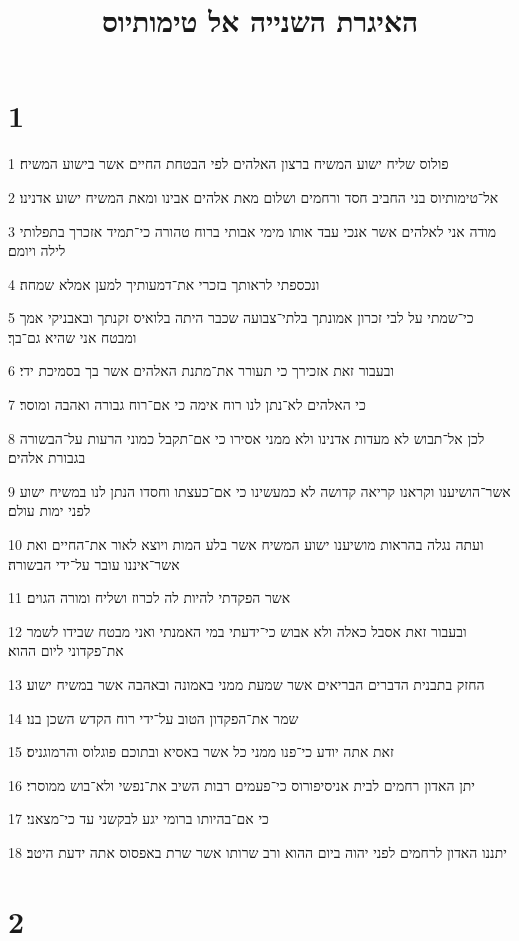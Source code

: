 

\title{האיגרת השנייה אל טימותיוס}


\chapter{1}

\par 1 פולוס שליח ישוע המשיח ברצון האלהים לפי הבטחת החיים אשר בישוע המשיח׃
\par 2 אל־טימותיוס בני החביב חסד ורחמים ושלום מאת אלהים אבינו ומאת המשיח ישוע אדנינו׃
\par 3 מודה אני לאלהים אשר אנכי עבד אותו מימי אבותי ברוח טהורה כי־תמיד אזכרך בתפלותי לילה ויומם׃
\par 4 ונכספתי לראותך בזכרי את־דמעותיך למען אמלא שמחה׃
\par 5 כי־שמתי על לבי זכרון אמונתך בלתי־צבועה שכבר היתה בלואיס זקנתך ובאבניקי אמך ומבטח אני שהיא גם־בך׃
\par 6 ובעבור זאת אזכירך כי תעורר את־מתנת האלהים אשר בך בסמיכת ידי׃
\par 7 כי האלהים לא־נתן לנו רוח אימה כי אם־רוח גבורה ואהבה ומוסר׃
\par 8 לכן אל־תבוש לא מעדות אדנינו ולא ממני אסירו כי אם־תקבל כמוני הרעות על־הבשורה בגבורת אלהים׃
\par 9 אשר־הושיענו וקראנו קריאה קדושה לא כמעשינו כי אם־כעצתו וחסדו הנתן לנו במשיח ישוע לפני ימות עולם׃
\par 10 ועתה נגלה בהראות מושיענו ישוע המשיח אשר בלע המות ויוצא לאור את־החיים ואת אשר־איננו עובר על־ידי הבשורה׃
\par 11 אשר הפקדתי להיות לה לכרוז ושליח ומורה הגוים׃
\par 12 ובעבור זאת אסבל כאלה ולא אבוש כי־ידעתי במי האמנתי ואני מבטח שבידו לשמר את־פקדוני ליום ההוא׃
\par 13 החזק בתבנית הדברים הבריאים אשר שמעת ממני באמונה ובאהבה אשר במשיח ישוע׃
\par 14 שמר את־הפקדון הטוב על־ידי רוח הקדש השכן בנו׃
\par 15 זאת אתה יודע כי־פנו ממני כל אשר באסיא ובתוכם פוגלוס והרמוגניס׃
\par 16 יתן האדון רחמים לבית אניסיפורוס כי־פעמים רבות השיב את־נפשי ולא־בוש ממוסרי׃
\par 17 כי אם־בהיותו ברומי יגע לבקשני עד כי־מצאני׃
\par 18 יתננו האדון לרחמים לפני יהוה ביום ההוא ורב שרותו אשר שרת באפסוס אתה ידעת היטב׃

\chapter{2}

